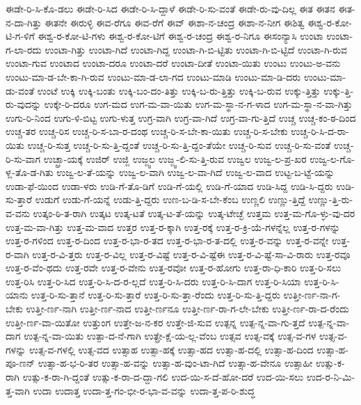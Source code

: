 {ಈಡೇ-ರಿ-ಸಿ-ಕೊ-ಡಲು
ಈಡೇ-ರಿ-ಸಿದ
ಈಡೇ-ರಿ-ಸಿ-ದ್ದಾಳೆ
ಈಡೇ-ರಿ-ಸು-ವಂತೆ
ಈಡೇ-ರು-ವು-ದಿಲ್ಲ
ಈತ
ಈತನ
ಈತ-ನ-ದಾ-ಗಿತ್ತು
ಈತನೇ
ಈರುಳ್ಳಿ
ಈವ-ರೆಗೂ
ಈವ-ರೆಗೆ
ಈವ್
ಈಶಾ-ನ-ಚಂದ್ರ
ಈಶಾ-ನ-ನೀಗ
ಈಶಿತ್ವ
ಈಶ್ವ-ರ-ಕೋ-ಟಿ-ಗ-ಳಿಗೆ
ಈಶ್ವ-ರ-ಕೋ-ಟಿ-ಗಳು
ಈಶ್ವ-ರ-ಕೋ-ಟಿಗೆ
ಈಶ್ವ-ರ-ಚಂದ್ರ
ಈಶ್ವ-ರ-ನಿಗೂ
ಈಸಂನ್ಯಾಸಿ
ಉಂಟಾ
ಉಂಟಾ-ಗ-ಲಾ-ರದು
ಉಂಟಾ-ಗಿತ್ತು
ಉಂಟಾ-ಗಿದೆ
ಉಂಟಾ-ಗಿದ್ದ
ಉಂಟಾ-ಗಿ-ಬಿ-ಟ್ಟಿತು
ಉಂಟಾ-ಗಿ-ಬಿ-ಟ್ಟಿದೆ
ಉಂಟಾ-ಗಿ-ರುವ
ಉಂಟಾ-ಗುವ
ಉಂಟಾದ
ಉಂಟಾ-ದರೂ
ಉಂಟಾ-ದರೆ
ಉಂಟಾ-ದೀತೆ
ಉಂಟಾ-ಯಿತು
ಉಂಟು
ಉಂಟು-ಅ-ವನು
ಉಂಟು-ಮಾ-ಡ-ಬೇ-ಕಾ-ಗಿ-ರುವ
ಉಂಟು-ಮಾ-ಡ-ಲಾ-ಗದ
ಉಂಟು-ಮಾಡಿ
ಉಂಟು-ಮಾ-ಡಿ-ದರು
ಉಂಟು-ಮಾ-ಡು-ವಂತೆ
ಉಂಟೆ
ಉಕ್ಕಿ
ಉಕ್ಕಿ-ಬಂತು
ಉಕ್ಕಿ-ಬಂ-ದಂ-ತಿತ್ತು
ಉಕ್ಕಿ-ಬ-ರು-ತ್ತಿತ್ತು
ಉಕ್ಕಿ-ಬ-ರುವ
ಉಕ್ಕು-ತ್ತಿತ್ತು
ಉಕ್ಕು-ತ್ತಿ-ರು-ವುದನ್ನು
ಉಕ್ಕೇ-ರಿ-ದರೂ
ಉಗ-ಮದ
ಉಗ-ಮ-ವಾ-ಯಿತು
ಉಗ-ಮ-ಸ್ಥಾ-ನ-ಗ-ಳಾದ
ಉಗ-ಮ-ಸ್ಥಾ-ನ-ವಾ-ಗಿತ್ತು
ಉಗು-ರಿ-ನಿಂದ
ಉಗು-ಳಿ-ಬಿಟ್ಟ
ಉಗು-ಳುತ್ತ
ಉಗ್ರ-ವಾಗಿ
ಉಗ್ರ-ವಾ-ಗಿದೆ
ಉಗ್ರ-ವಾ-ಗು-ತ್ತಿದೆ
ಉಚ್ಚ
ಉಚ್ಚ-ಕಂ-ಠ-ದಿಂದ
ಉಚ್ಚ-ತರ
ಉಚ್ಚ-ರಿಸ
ಉಚ್ಚ-ರಿ-ಸ-ಬಾ-ರ-ದಂಥ
ಉಚ್ಚ-ರಿ-ಸ-ಬೇ-ಕಾ-ಯಿತು
ಉಚ್ಚ-ರಿ-ಸ-ಬೇಕು
ಉಚ್ಚ-ರಿ-ಸಿ-ದ-ರಾ-ಯಿತು
ಉಚ್ಚ-ರಿ-ಸುತ್ತ
ಉಚ್ಚ-ರಿ-ಸು-ತ್ತಿ-ದ್ದಂತೆ
ಉಚ್ಚ-ರಿ-ಸು-ತ್ತಿ-ದ್ದಂ-ತೆಯೇ
ಉಚ್ಚ-ರಿ-ಸುವ
ಉಚ್ಚ-ರಿ-ಸು-ವಂತೆ
ಉಚ್ಚ-ರಿ-ಸು-ವಾಗ
ಉಚ್ಛ್ರಾ-ಯಕ್ಕೆ
ಉಜಿರ್
ಉಜ್ಜಿ
ಉಜ್ಜ್ವಲ
ಉಜ್ಜ್ವ-ಲಿ-ಸು-ತ್ತಿ-ರುವ
ಉಜ್ವಲ
ಉಜ್ವ-ಲ-ಪ್ರ-ಖರ
ಉಜ್ವ-ಲ-ಗೊ-ಳ್ಲ-ತೊ-ಡ-ಗಿತು
ಉಜ್ವ-ಲ-ತೆ-ಯನ್ನು
ಉಜ್ವ-ಲ-ವಾಗಿ
ಉಜ್ವ-ಲ-ವಾ-ಗಿದೆ
ಉಜ್ವ-ಲ-ವಾದ
ಉಟ್ಟ-ಬ-ಟ್ಟೆ-ಯನ್ನು
ಉಡಾ-ಫೆ-ಯಿಂದ
ಉಡಾ-ಳರು
ಉಡಿ-ಗೆ-ತೊ-ಡಿಗೆ
ಉಡಿ-ಗೆ-ಯಲ್ಲಿ
ಉಡಿ-ಗೆ-ಯಾದ
ಉಡಿ-ಸಿದ್ದ
ಉಡಿ-ಸಿ-ದ್ದರು
ಉಡಿ-ಸು-ತ್ತಾರೆ
ಉಡುಗೆ
ಉಡು-ಗೆ-ಯನ್ನೆ
ಉಡು-ತ್ತಿ-ದ್ದರು
ಉಣ-ಬ-ಡಿ-ಸ-ಬೇ-ಕೆಂಬ
ಉಣ್ಣಲಿ
ಉಣ್ಣು-ತ್ತಿದ್ದೆ
ಉಣ್ಣು-ತ್ತಿ-ರು-ವ-ವನು
ಉತ್ಕಂ-ಠಿ-ತ-ರಾಗಿ
ಉತ್ಕಟ
ಉತ್ಕ-ಟತೆ
ಉತ್ಕ-ಟ-ತೆ-ಯನ್ನು
ಉತ್ಕ-ಟೇಚ್ಛೆ
ಉತ್ತಮ
ಉತ್ತ-ಮ-ಗೊ-ಳ್ಳು-ವು-ದರ
ಉತ್ತ-ಮ-ವಾ-ಗಿತ್ತು
ಉತ್ತ-ಮ-ವಾದ
ಉತ್ತರ
ಉತ್ತ-ರ-ಕ್ಕಾಗಿ
ಉತ್ತ-ರಕ್ಕೆ
ಉತ್ತ-ರ-ಕ್ರಿ-ಯೆ-ಗಳನ್ನೆಲ್ಲ
ಉತ್ತ-ರ-ಗಳನ್ನು
ಉತ್ತ-ರ-ಗಳಿಂದ
ಉತ್ತ-ರ-ದಿಂದ
ಉತ್ತ-ರ-ಭಾ-ರ-ತದ
ಉತ್ತ-ರ-ಭಾ-ರ-ತ-ದಲ್ಲಿ
ಉತ್ತ-ರ-ವನ್ನು
ಉತ್ತ-ರ-ವನ್ನೇ
ಉತ್ತ-ರ-ವಾಗಿ
ಉತ್ತ-ರ-ವಿ-ತ್ತರು
ಉತ್ತ-ರ-ವಿಲ್ಲ
ಉತ್ತ-ರ-ವಿಷ್ಟೆ
ಉತ್ತ-ರ-ವಿ-ಷ್ಟೆಈ
ಉತ್ತ-ರ-ವಿ-ಷ್ಟೆ-ಸಾ-ವಿ-ರಾರು
ಉತ್ತ-ರವೂ
ಉತ್ತ-ರ-ವೆಂ-ಥದು
ಉತ್ತ-ರವೇ
ಉತ್ತ-ರ-ವೇನು
ಉತ್ತ-ರವೋ
ಉತ್ತ-ರ-ಹೋಗು
ಉತ್ತ-ರಾ-ಧಿ-ಕಾರಿ
ಉತ್ತ-ರಿ-ಸಲು
ಉತ್ತ-ರಿಸಿ
ಉತ್ತ-ರಿ-ಸಿದ
ಉತ್ತ-ರಿ-ಸಿ-ದ-ರ-ಲ್ಲದೆ
ಉತ್ತ-ರಿ-ಸಿ-ದರು
ಉತ್ತ-ರಿ-ಸಿ-ದಾಗ
ಉತ್ತ-ರಿ-ಸಿಯಾ
ಉತ್ತ-ರಿ-ಸಿ-ಯಾನು
ಉತ್ತ-ರಿ-ಸು-ತ್ತಾನೆ
ಉತ್ತ-ರಿ-ಸು-ತ್ತಾರೆ
ಉತ್ತ-ರಿ-ಸು-ತ್ತಾ-ರೆಂದು
ಉತ್ತ-ರಿ-ಸು-ತ್ತಿ-ದ್ದರು
ಉತ್ತೀ-ರ್ಣ-ನಾ-ಗ-ಬೇಕು
ಉತ್ತೀ-ರ್ಣ-ನಾಗಿ
ಉತ್ತೀ-ರ್ಣ-ನಾದ
ಉತ್ತೀ-ರ್ಣನೂ
ಉತ್ತೀ-ರ್ಣ-ರಾ-ಗ-ಲೇ-ಬೇಕು
ಉತ್ತೀ-ರ್ಣ-ರಾ-ದ-ರೆಂದು
ಉತ್ತೀ-ರ್ಣ-ವಾ-ಯಿತೋ
ಉತ್ತುಂಗ
ಉತ್ತೇ-ಜ-ನ-ಕರ
ಉತ್ತೇ-ಜಿ-ಸುವ
ಉತ್ಪನ್ನ
ಉತ್ಪ-ನ್ನ-ವಾ-ಗು-ತ್ತದೆ
ಉತ್ಪ-ನ್ನ-ವಾ-ದಾಗ
ಉತ್ಪ-ನ್ನ-ವಾ-ಯಿತು
ಉತ್ಪಾ-ದ-ನೆ-ಗಾಗಿ
ಉತ್ಪ್ರೇ-ಕ್ಷೆ-ಯ-ಲ್ಲ-ವೆಂಬ
ಉತ್ಸವ
ಉತ್ಸ-ವಕ್ಕೆ
ಉತ್ಸ-ವ-ಗಳ
ಉತ್ಸ-ವ-ಗಳನ್ನು
ಉತ್ಸ-ವ-ಗಳಲ್ಲಿ
ಉತ್ಸ-ವದ
ಉತ್ಸಾಹ
ಉತ್ಸಾ-ಹಕ್ಕೆ
ಉತ್ಸಾ-ಹದ
ಉತ್ಸಾ-ಹ-ದಲ್ಲಿ
ಉತ್ಸಾ-ಹ-ದಿಂದ
ಉತ್ಸಾ-ಹ-ಪೂ-ಣನ್
ಉತ್ಸಾ-ಹ-ಭ-ರಿ-ತರ
ಉತ್ಸಾ-ಹ-ವನ್ನು
ಉತ್ಸಾ-ಹ-ವುಂ-ಟಾ-ಗಿದೆ
ಉತ್ಸಾ-ಹ-ವೇನೂ
ಉತ್ಸಾಹೀ
ಉತ್ಸು-ಕ-ರಾಗಿ
ಉತ್ಸು-ಕ-ರಾ-ಗಿ-ದ್ದಂತೆ
ಉತ್ಸು-ಕ-ರಾ-ದ-ದ್ದಾ-ಗಲಿ
ಉದ-ಯಿ-ಸ-ದೆ-ಹೋ-ದರೆ
ಉದ-ಯಿ-ಸಲು
ಉದ-ರ-ನಿ-ಮಿ-ತ್ತ-ವಾಗಿ
ಉದಾ
ಉದಾತ್ತ
ಉದಾ-ತ್ತ-ಗಂ-ಭೀ-ರ-ಭಾ-ವ-ವನ್ನು
ಉದಾ-ತ್ತ-ಪ-ರಿ-ಶುದ್ಧ
}

